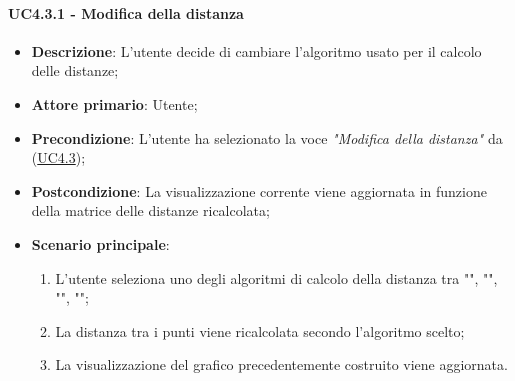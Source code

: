 \paragraph{UC4.3.1 - Modifica della distanza}
\label{par:uc4.3.1}
\begin{itemize}
    \item \textbf{Descrizione}: L’utente decide di cambiare l’algoritmo usato per il calcolo delle distanze;

    \item \textbf{Attore primario}: Utente;

    \item \textbf{Precondizione}:   L'utente ha selezionato la voce \emph{"Modifica della distanza"} da (\hyperref[ssub:uc4.3]{UC4.3});
    \item \textbf{Postcondizione}:  La visualizzazione corrente viene aggiornata in funzione della matrice delle distanze ricalcolata;

	\item \textbf{Scenario principale}:
        \begin{enumerate}
            \item L'utente seleziona uno degli algoritmi di calcolo della distanza tra "", 
            "", "", "";
            \item La distanza tra i punti viene ricalcolata secondo l'algoritmo scelto;
            \item La visualizzazione del grafico precedentemente costruito viene aggiornata.
        \end{enumerate}
\end{itemize}


